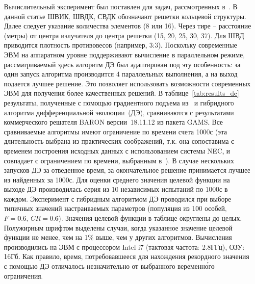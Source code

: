 Вычислительный эксперимент был поставлен для задач, рассмотренных в~\cite{tyu:daor,tyu22:ring}. В данной
статье ШВИК, ШВДК, СВДК обозначают решетки кольцевой структуры. Далее следует указание количества элементов (8 или 16).
Через тире -- расстояние (метры) от центра излучателя до центра решетки (15, 20, 25, 30, 37). Для ШВД приводится плотность противовесов (например, 3:3). Поскольку современные ЭВМ на аппаратном уровне поддерживают вычисление в параллельном режиме, рассматриваемый здесь алгоритм ДЭ был адаптирован под эту особенность: за один запуск алгоритма производится 4 параллельных выполнения, а на выход подается лучшее решение. Это позволяет использовать возможности современных ЭВМ для получения более качественных решений.
В таблице~\ref{tab:results_de} результаты, полученные с помощью градиентного подъема из~\cite{tyu:daor} и гибридного алгоритма дифференциальной эволюции~(ДЭ),
сравниваются с результатами коммерческого решателя BARON версии~18.11.12 из пакета GAMS.
Все сравниваемые алгоритмы имеют ограничение по времени счета 1000с (эта длительность выбрана из практических соображений, т.к. она сопоставима с временем построения исходных данных с использованием системы NEC, и совпадает с ограничением по времени, выбранным в~\cite{tyu:daor}).
В случае нескольких запусков ДЭ за отведенное время, за окончательное решение принимается лучшее из найденных за 1000с.
Для оценки среднего значения целевой функции на выходе ДЭ производилась серия из 10 независимых испытаний по
1000с в каждом. Эксперимент с гибридным алгоритмом ДЭ проводился при выборе типичных значений настраиваемых параметров
(популяция из 100 особей, $F=0.6$, $CR=0.6$). Значения целевой функции в таблице округлены до целых.
Полужирным шрифтом выделены случаи, когда указанное значение целевой функции не менее, чем на 1\% выше, чем у других алгоритмов.
Вычисления производились на ЭВМ с процессором Intel i7 (тактовая частота: 2.8ГГц), ОЗУ: 16Гб. 
Как правило, время, потребовавшееся для нахождения рекордного значения с помощью ДЭ отличалось незначительно от выбранного веременн\'{о}го ограничения.


